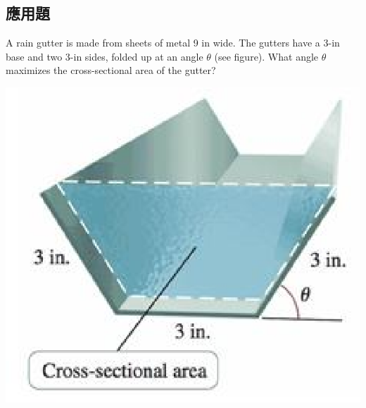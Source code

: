 \documentclass[a4paper,12pt]{article}
\begin{document}
\begin{CJK}{UTF8}{bsmi}
\section{應用題}
A rain gutter is made from sheets of metal 9 in wide. The gutters have a 3-in base and two 3-in sides, folded up at an angle
$\theta$ (see figure). What angle $\theta$ maximizes the cross-sectional area of the gutter?
\begin{center}
\includegraphics[scale=0.5]{gutter.eps}
\end{center}
\newpage
\end{CJK}
\end{document}
